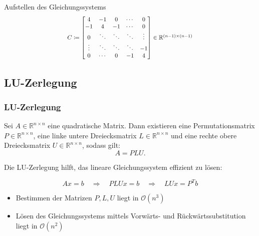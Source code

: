 \documentclass[9pt, t]{beamer}
\newcommand\R{\mathbb{R}}
\begin{document}
\begin{frame}{Aufstellen des Gleichungssystems}
\[\begin{array}{ccc}
            \scalebox{0.85}{$
                    \begin{array}{l}
                        C \coloneq \begin{bmatrix}
                                       4      & -1     & 0      & \cdots & 0      \\
                                       -1     & 4      & -1     & \cdots & 0      \\
                                       0      & \ddots & \ddots & \ddots & \vdots \\
                                       \vdots & \ddots & \ddots & \ddots & -1     \\
                                       0      & \cdots & 0      & -1     & 4
                                   \end{bmatrix}
                        \in \mathbb{R}^{(n-1) \times (n-1)}
                    \end{array}
                $}
        \end{array}
    \]

\end{frame}

\subsection{LU-Zerlegung}
\begin{frame}
    \frametitle{LU-Zerlegung}

    Sei \(A \in \mathbb{R}^{n \times n}\) eine quadratische Matrix. Dann
    existieren eine Permutationsmatrix \(P \in \R^{n \times n}\), eine linke
    untere Dreiecksmatrix \(L \in \mathbb{R}^{n \times n}\) und eine rechte
    obere Dreiecksmatrix \(U \in \mathbb{R}^{n \times n}\), sodass gilt:
    \[
        A = PLU.
    \]

    Die LU-Zerlegung hilft, das lineare Gleichungssystem effizient zu lösen:

    \[
        A x = b \quad \Rightarrow \quad PLU x = b \quad \Rightarrow \quad LU x = P^T b
    \]
    \begin{itemize}
        \item Bestimmen der Matrizen \(P, L, U\) liegt in \(\mathcal{O}(n^3)\)
        \item Lösen des Gleichungssystems mittels Vorwärts- und
              Rückwärtssubstitution liegt in \(\mathcal{O}(n^2)\)
    \end{itemize}
\end{frame}
\end{document}
